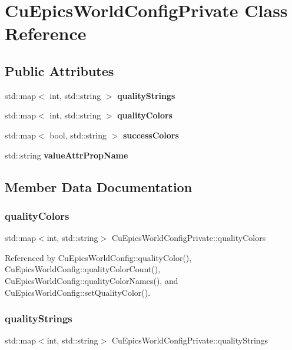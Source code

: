 \section{Cu\+Epics\+World\+Config\+Private Class Reference}
\label{classCuEpicsWorldConfigPrivate}
\subsection*{Public Attributes}
\begin{DoxyCompactItemize}
\item 
std\+::map$<$ int, std\+::string $>$ \textbf{ quality\+Strings}
\item 
std\+::map$<$ int, std\+::string $>$ \textbf{ quality\+Colors}
\item 
std\+::map$<$ bool, std\+::string $>$ \textbf{ success\+Colors}
\item 
std\+::string \textbf{ value\+Attr\+Prop\+Name}
\end{DoxyCompactItemize}


\subsection{Member Data Documentation}
\mbox{\label{classCuEpicsWorldConfigPrivate_ab4de0c9e85665f807870f9d98e782d39}} 
\subsubsection{quality\+Colors}
{\footnotesize\ttfamily std\+::map$<$int, std\+::string$>$ Cu\+Epics\+World\+Config\+Private\+::quality\+Colors}



Referenced by Cu\+Epics\+World\+Config\+::quality\+Color(), Cu\+Epics\+World\+Config\+::quality\+Color\+Count(), Cu\+Epics\+World\+Config\+::quality\+Color\+Names(), and Cu\+Epics\+World\+Config\+::set\+Quality\+Color().

\mbox{\label{classCuEpicsWorldConfigPrivate_aa09f44a8b77d0404f2d13098a5e2c8d7}} 
\subsubsection{quality\+Strings}
{\footnotesize\ttfamily std\+::map$<$int, std\+::string$>$ Cu\+Epics\+World\+Config\+Private\+::quality\+Strings}



